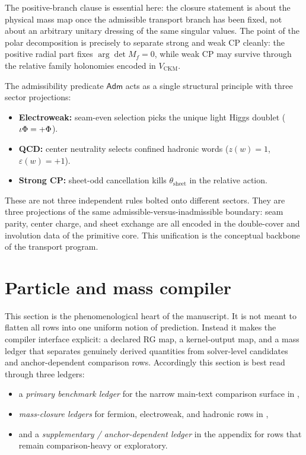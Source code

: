 The positive-branch clause is essential here: the closure statement is about the physical mass map once the admissible transport branch has been fixed, not about an arbitrary unitary dressing of the same singular values. The point of the polar decomposition is precisely to separate strong and weak CP cleanly: the positive radial part fixes $\arg\det M_f=0$, while weak CP may survive through the relative family holonomies encoded in $V_{\mathrm{CKM}}$.

\begin{remark}
The admissibility predicate $\mathsf{Adm}$ acts as a single structural principle with three sector projections:
\begin{itemize}[leftmargin=1.5em, topsep=3pt, itemsep=2pt]
    \item \textbf{Electroweak:} seam-even selection picks the unique light Higgs doublet ($\iota\Phi=+\Phi$).
    \item \textbf{QCD:} center neutrality selects confined hadronic words ($z(w)=1$, $\varepsilon(w)=+1$).
    \item \textbf{Strong CP:} sheet-odd cancellation kills $\theta_{\mathrm{sheet}}$ in the relative action.
\end{itemize}
These are not three independent rules bolted onto different sectors. They are three projections of the same admissible-versus-inadmissible boundary: seam parity, center charge, and sheet exchange are all encoded in the double-cover and involution data of the primitive core. This unification is the conceptual backbone of the transport program.
\end{remark}

\section{Particle and mass compiler}

This section is the phenomenological heart of the manuscript. It is not meant to flatten all rows into one uniform notion of prediction. Instead it makes the compiler interface explicit: a declared RG map, a kernel-output map, and a mass ledger that separates genuinely derived quantities from solver-level candidates and anchor-dependent comparison rows.
Accordingly this section is best read through three ledgers:
\begin{itemize}[leftmargin=1.5em, topsep=3pt, itemsep=2pt]
    \item a \emph{primary benchmark ledger} for the narrow main-text comparison surface in ,
    \item \emph{mass-closure ledgers} for fermion, electroweak, and hadronic rows in ,
    \item and a \emph{supplementary / anchor-dependent ledger} in the appendix for rows that remain comparison-heavy or exploratory.
\end{itemize}

